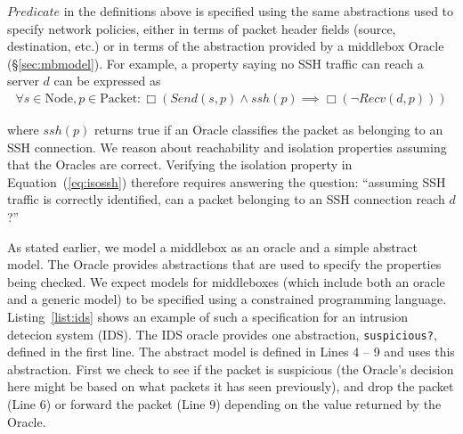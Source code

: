 $Predicate$ in the definitions above is specified using the same abstractions used to specify network policies, \ie either in terms of packet
header fields (source, destination, etc.) or in terms of the abstraction provided by a middlebox Oracle (\S\ref{sec:mbmodel}). For example, a property
saying no SSH traffic can reach a server $d$ can be expressed as
\begin{align}
\forall s\in \text{Node}, p\in \text{Packet}: \Box (Send(s, p) \land ssh(p) \implies \Box(\neg Recv(d, p))) \label{eq:isossh}
\end{align}

where $ssh(p)$ returns true if an Oracle classifies the packet as belonging to an SSH connection.
We reason about reachability and isolation properties assuming that the Oracles are correct.
Verifying the isolation property in Equation~(\ref{eq:isossh}) therefore requires answering the question:
``assuming SSH traffic is correctly identified, can a packet belonging to an SSH connection reach $d$?''


As stated earlier, we model a middlebox as an oracle and a simple abstract model. The Oracle provides abstractions that are used to specify the
properties being checked. We expect models for middleboxes (which include both an oracle and a generic model) to be specified
using a constrained programming language. Listing~\ref{list:ids} shows an example of such a specification
for an intrusion detecion system (IDS). The IDS oracle provides one abstraction, \texttt{suspicious?}, defined in the first line. The abstract model is
defined in Lines 4 -- 9 and uses this abstraction. First we check to see if the packet is suspicious (the Oracle's decision here might be based on what
packets it has seen previously), and  drop the packet (Line 6) or forward the packet (Line 9) depending on the value returned by the Oracle.

